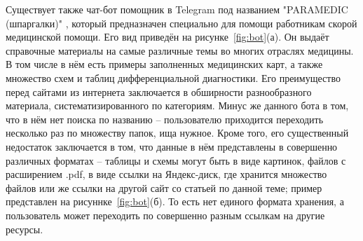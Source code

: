 Существует также чат-бот помощник в Telegram под названием "PARAMEDIC (шпаргалки)" \cite{paramedic}, который предназначен специально для помощи работникам скорой медицинской помощи. Его вид приведён на рисунке~\ref{fig:bot}(а).  Он выдаёт справочные материалы на самые различные темы во многих отраслях медицины. В том числе в нём есть примеры заполненных медицинских карт, а также множество схем и таблиц дифференциальной диагностики. Его преимущество перед сайтами из интернета заключается в обширности разнообразного материала, систематизированного по категориям. Минус же данного бота в том, что в нём нет поиска по названию --  пользователю приходится переходить несколько раз по множеству папок, ища нужное. Кроме того, его существенный недостаток заключается в том, что данные в нём представлены в совершенно различных форматах -- таблицы и схемы могут быть в виде картинок, файлов с расширением .pdf, в виде ссылки на Яндекс-диск, где хранится множество файлов или же ссылки на другой сайт со статьей по данной теме; пример представлен на рисуннке~\ref{fig:bot}(б). То есть нет единого формата хранения, а пользователь может переходить по совершенно разным ссылкам на другие ресурсы. 


